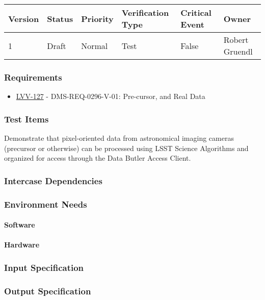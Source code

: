 \begin{longtable}[]{llllll}
\toprule
Version & Status & Priority & Verification Type & Critical Event & Owner
\\\midrule
1 & Draft & Normal &
Test & False & Robert Gruendl
\\\bottomrule
\end{longtable}

\subsubsection{Requirements}
\begin{itemize}
\item \href{https://jira.lsstcorp.org/browse/LVV-127}{LVV-127} - DMS-REQ-0296-V-01: Pre-cursor, and Real Data
\end{itemize}

\subsubsection{Test Items}
Demonstrate that pixel-oriented data from astronomical imaging cameras
(precursor or otherwise) can be processed using LSST Science Algorithms
and organized for access through the Data Butler Access Client. ~



\subsubsection{Intercase Dependencies}

\subsubsection{Environment Needs}

\paragraph{Software}

\paragraph{Hardware}

\subsubsection{Input Specification}

\subsubsection{Output Specification}

